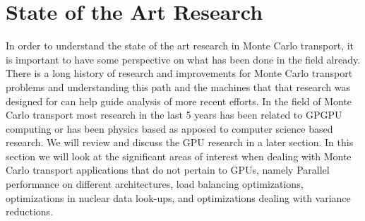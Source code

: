 \section{State of the Art Research}

In order to understand the state of the art research in Monte Carlo transport, it is important to have some perspective on what has been done in the field already.
%
There is a long history of research and improvements for Monte Carlo transport problems and understanding this path and the machines that that research was designed for can help guide analysis of more recent efforts.
%
In the field of Monte Carlo transport most research in the last 5 years has been related to GPGPU computing or has been physics based as apposed to computer science based research.
%
We will review and discuss the GPU research in a later section.
%
In this section we will look at the significant areas of interest when dealing with Monte Carlo transport applications that do not pertain to GPUs, namely Parallel performance on different architectures, load balancing optimizations, optimizations in nuclear data look-ups, and optimizations dealing with variance reductions.
%
